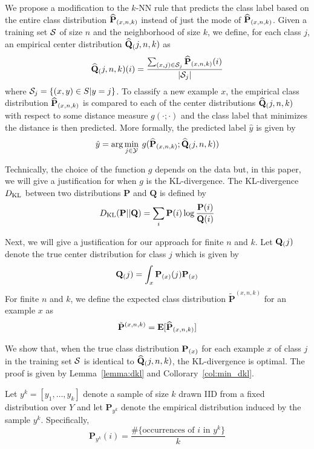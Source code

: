 \documentclass{article}
\begin{document}

We propose a modification to the $k$-NN rule that predicts the class
label based on the entire class distribution $\widehat{\mathbf{P}}_{(x,n,k)}$ instead of just
the mode of $\widehat{\mathbf{P}}_{(x,n,k)}$. Given a training set $\mathcal{S}$ of size $n$ and
the neighborhood of size $k$, we define, for each class $j$, an
empirical center distribution $\widehat{\mathbf{Q}}_(j,n,k)$ as
\[
\widehat{\mathbf{Q}}_(j,n,k)(i) = \frac{\sum_{(x,j) \in \mathcal{S}_j} \widehat{\mathbf{P}}_{(x,n,k)}(i)}{|\mathcal{S}_j|}
\]
where $\mathcal{S}_j = \{ (x,y) \in S | y = j \}$.  To classify a new
example $x$, the empirical class distribution $\widehat{\mathbf{P}}_{(x,n,k)}$ is compared to
each of the center distributions $\widehat{\mathbf{Q}}_(j,n,k)$ with respect to some distance
measure $g(\cdot ; \cdot)$ and the class label that minimizes the
distance is then predicted. More formally, the predicted label
$\hat{y}$ is given by
\[
\hat{y} = \arg\min_{j \in \mathcal{Y}} \: g(\widehat{\mathbf{P}}_{(x,n,k)} ; \widehat{\mathbf{Q}}_(j,n,k))
\]

Technically, the choice of the function $g$ depends on the data but,
in this paper, we will give a justification for when $g$ is the
KL-divergence. The KL-divergence $D_{\mathrm{KL}}$ between two
distributions $\mathbf{P}$ and $\mathbf{Q}$ is defined by
\[
D_{\mathrm{KL}}(\mathbf{P} || \mathbf{Q}) = \sum_i \mathbf{P}(i) \log \frac{\mathbf{P}(i)}{\mathbf{Q}(i)}
\]

\newcommand{\Pexpected}{\tilde{\mathbf{P}}^{(x,n,k)}}

Next, we will give a justification for our approach for finite $n$ and
$k$. Let $\mathbf{Q}_(j)$ denote the true center distribution for class $j$
which is given by
\[
\mathbf{Q}_(j) = \int_x \mathbf{P}_{(x)}(j) \mathbf{P}_{(x)}
\]
For finite $n$ and $k$, we define the expected class distribution $\Pexpected$ for an example
$x$ as
\[
\Pexpected = \mathbf{E}[\Pemp]
\]








We show that, when the true class distribution $\mathbf{P}_{(x)}$ for each
example $x$ of class $j$ in the training set $\mathcal{S}$ is identical
to $\widehat{\mathbf{Q}}_(j,n,k)$, the KL-divergence is optimal. The proof is
given by Lemma~\ref{lemma:dkl} and Collorary~\ref{col:min_dkl}. 

\newcommand{\sampleYK}{y^k}
\newcommand{\sampleEmpDist}{\mathbf{P}_{y^k}}
\newcommand{\Q}{\mathbf{Q}}

Let $\sampleYK = [y_1, \ldots, y_k]$ denote a sample of size $k$ drawn IID
from a fixed distribution over $Y$ and let $\sampleEmpDist$ denote the
empirical distribution induced by the sample
$\sampleYK$. Specifically,
\[
\sampleEmpDist(i) = \frac{\#\{ \mbox{occurrences of } i \mbox{ in } y^k\}}{k}
\]
\end{document}
